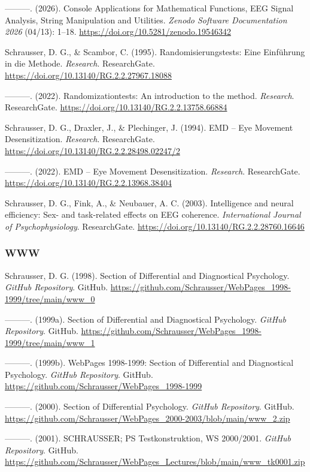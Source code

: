 \documentclass[
]{article}
\begin{document}
---------. (2026). Console Applications for Mathematical Functions, EEG
Signal Analysis, String Manipulation and Utilities. \emph{Zenodo
Software Documentation 2026} (04/13): 1--18.
\url{https://doi.org/10.5281/zenodo.19546342}

Schrausser, D. G., \& Scambor, C. (1995). Randomisierungstests: Eine
Einführung in die Methode. \emph{Research}. ResearchGate.
\url{https://doi.org/10.13140/RG.2.2.27967.18088}

---------. (2022). Randomizationtests: An introduction to the method.
\emph{Research}. ResearchGate.
\url{https://doi.org/10.13140/RG.2.2.13758.66884}

Schrausser, D. G., Draxler, J., \& Plechinger, J. (1994). EMD -- Eye
Movement Desensitization. \emph{Research}. ResearchGate.
\url{https://doi.org/10.13140/RG.2.2.28498.02247/2}

---------. (2022). EMD -- Eye Movement Desensitization. \emph{Research}.
ResearchGate. \url{https://doi.org/10.13140/RG.2.2.13968.38404}

Schrausser, D. G., Fink, A., \& Neubauer, A. C. (2003). Intelligence and
neural efficiency: Sex- and task-related effects on EEG coherence.
\emph{International Journal of Psychophysiology}. ResearchGate.
\url{https://doi.org/10.13140/RG.2.2.28760.16646}

\hypertarget{www}{%
\subsubsection{WWW}\label{www}}

Schrausser, D. G. (1998). Section of Differential and Diagnostical
Psychology. \emph{GitHub Repository}. GitHub.
\url{https://github.com/Schrausser/WebPages_1998-1999/tree/main/www_0}

---------. (1999a). Section of Differential and Diagnostical Psychology.
\emph{GitHub Repository}. GitHub.
\url{https://github.com/Schrausser/WebPages_1998-1999/tree/main/www_1}

---------. (1999b). WebPages 1998-1999: Section of Differential and
Diagnostical Psychology. \emph{GitHub Repository}. GitHub.
\url{https://github.com/Schrausser/WebPages_1998-1999}

---------. (2000). Section of Differential Psychology. \emph{GitHub
Repository}. GitHub.
\url{https://github.com/Schrausser/WebPages_2000-2003/blob/main/www_2.zip}

---------. (2001). SCHRAUSSER; PS Testkonstruktion, WS 2000/2001.
\emph{GitHub Repository}. GitHub.
\url{https://github.com/Schrausser/WebPages_Lectures/blob/main/www_tk0001.zip}
\end{document}
